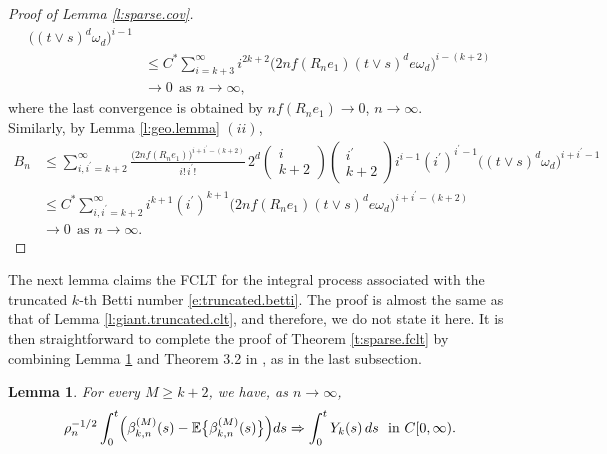 \documentclass[11pt]{amsart}
\numberwithin{equation}{section}
\theoremstyle{plain}
\newtheorem{lemma}[theorem]{Lemma}
\theoremstyle{definition}
\begin{document}
\begin{proof}[Proof of Lemma \ref{l:sparse.cov}]
\begin{align*}
 \bigl( (t\vee s)^d \omega_d \bigr)^{i-1} \\
&\leq C^* \sum_{i=k+3}^\infty i^{2k+2} \bigl(  2nf(R_ne_1) (t\vee s)^d e\omega_d \bigr)^{i-(k+2)}  \\
&\to 0 \ \ \text{as } n\to\infty,
\end{align*}
where the last convergence is obtained by $nf(R_ne_1) \to 0$, $n\to\infty$.  \\
Similarly, by Lemma \ref{l:geo.lemma} $(ii)$,
\begin{align*}
B_n &\leq \sum_{i, {i^{\prime}} =k+2}^\infty \frac{\bigl(  2nf(R_ne_1) \bigr)^{i+{i^{\prime}}-(k+2)}}{i!\, {i^{\prime}} !}\,  2^d \begin{pmatrix} i \\ k+2 \end{pmatrix} \begin{pmatrix} {i^{\prime}} \\ k+2 \end{pmatrix} i^{i-1} ({i^{\prime}})^{{i^{\prime}} -1} \bigl( (t\vee s)^d \omega_d \bigr)^{i+{i^{\prime}}-1} \\
&\leq C^* \sum_{i, {i^{\prime}} =k+2}^\infty i^{k+1} ({i^{\prime}})^{k+1} \bigl(  2nf(R_ne_1) (t\vee s)^d e\omega_d \bigr)^{i+{i^{\prime}}-(k+2)}  \\
&\to 0 \ \ \text{as } n\to \infty.
\end{align*}
\end{proof}
The next lemma claims the FCLT for the integral process associated with the truncated $k$-th Betti number  \eqref{e:truncated.betti}. The proof is almost the same as that of Lemma \ref{l:giant.truncated.clt}, and therefore, we do not state it here. It is then straightforward to complete the proof of Theorem \ref{t:sparse.fclt} by combining Lemma \ref{l:sparse.truncated.clt} and Theorem 3.2 in \cite{billingsley:1999}, as in the last subsection.
\begin{lemma}  \label{l:sparse.truncated.clt}
For every $M\geq k+2$, we have, as $n\to\infty$,
$$
\rho_n^{-1/2} \int_0^t \Bigl( \beta_{k,n}^{(M)}(s) - {\mathbb{E}} \bigl\{ \beta_{k,n}^{(M)}(s) \bigr\} \Bigr)ds \Rightarrow \int_0^t Y_k(s)\, ds \ \ \text{in } C[0,\infty).
$$
\end{lemma}
\end{document}
